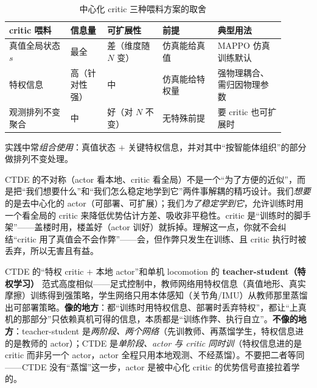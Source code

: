 \begin{table}[H]\centering\small
\caption{中心化 critic 三种喂料方案的取舍}
\label{tab:mc-critic-feed}
\begin{tabular}{p{0.20\linewidth}p{0.12\linewidth}p{0.18\linewidth}p{0.18\linewidth}p{0.22\linewidth}}
\toprule
critic 喂料 & 信息量 & 可扩展性 & 前提 & 典型用法 \\
\midrule
真值全局状态 $s$ & 最全 & 差（维度随 $N$ 变） & 仿真能给真值 & MAPPO 仿真训练默认 \\
特权信息 & 高（针对性强） & 中 & 仿真能给特权量 & 强物理耦合、需归因物理参数 \\
观测排列不变聚合 & 中 & 好（对 $N$ 不变） & 无特殊前提 & 要 critic 也可扩展时 \\
\bottomrule
\end{tabular}
\end{table}

\noindent 实践中常\emph{组合使用}：真值状态 $+$ 关键特权信息，并对其中“按智能体组织”的部分做排列不变处理。

\begin{insight}
CTDE 的不对称（actor 看本地、critic 看全局）不是一个“为了方便的近似”，而是把“我们想要什么”和“我们怎么稳定地学到它”两件事解耦的精巧设计。我们\emph{想要}的是去中心化的 actor（可部署、可扩展）；我们\emph{为了稳定学到它}，允许训练时用一个看全局的 critic 来降低优势估计方差、吸收非平稳性。critic 是“训练时的脚手架”——盖楼时用，楼盖好（actor 训好）就拆掉。理解这一点，你就不会纠结“critic 用了真值会不会作弊”——会，但作弊只发生在训练、且 critic 执行时被丢弃，所以无害且有益。
\end{insight}

\begin{insight}
CTDE 的“特权 critic $+$ 本地 actor”和单机 locomotion 的 \textbf{teacher-student（特权学习）} 范式高度相似——足式控制中，教师网络用特权信息（真值地形、真实摩擦）训练得到强策略，学生网络只用本体感知（关节角/IMU）从教师那里蒸馏出可部署策略。\textbf{像的地方}：都“训练时用特权信息、部署时丢弃特权”，都让“上真机的那部分”只依赖真机可得的信息，本质都是“训练作弊、执行自立”。\textbf{不像的地方}：teacher-student 是\emph{两阶段、两个网络}（先训教师、再蒸馏学生，特权信息进的是教师的 actor）；CTDE 是\emph{单阶段、actor 与 critic 同时训}（特权信息进的是 critic 而非另一个 actor，actor 全程只用本地观测、不经蒸馏）。不要把二者等同——CTDE 没有“蒸馏”这一步，actor 是被中心化 critic 的优势信号直接拉着学的。
\end{insight}

